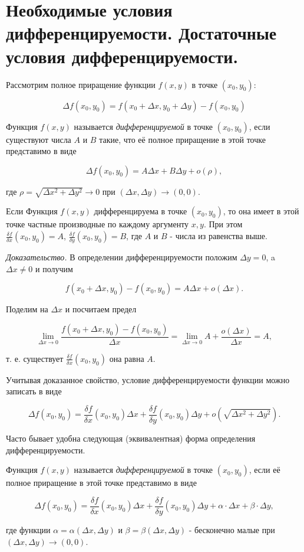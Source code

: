 \section{Необходимые условия дифференцируемости. Достаточные условия дифференцируемости.}

Рассмотрим полное приращение функции $f(x,y)$ в точке $(x_0,y_0)$:

$$\Delta{f(x_0,y_0)}=f(x_0+\Delta{x},y_0+\Delta{y})-f(x_0,y_0)$$

\begin{definition}
    Функция $f(x,y)$ называется \textit{дифференцируемой} в точке $(x_0,y_0)$, если существуют числа $A$ и $B$
    такие, что её полное приращение в этой точке представимо в виде
\end{definition}

$$\Delta{f(x_0,y_0)}=A\Delta{x}+B\Delta{y}+o(\rho),$$

где $\rho=\sqrt{\Delta{x^2}+\Delta{y^2}}\to{0}$ при $(\Delta{x},\Delta{y})\to(0,0)$.

\begin{theorem}
    Если Функция $f(x,y)$ дифференцируема в точке $(x_0,y_0)$, то она имеет в этой точке частные производные по каждому аргументу $x,y$.
    При этом $\frac{\delta{f}}{\delta{x}}(x_0,y_0)=A$, $\frac{\delta{f}}{\delta{y}}(x_0,y_0)=B$,
    где $A$ и $B$ - числа из равенства выше.
\end{theorem}

\textit{Доказательство.}
В определении дифференцируемости положим $\Delta{y}=0$, a $\Delta{x}\neq{0}$ и получим

$$f(x_0+\Delta{x},y_0)-f(x_0,y_0)=A\Delta{x}+o(\Delta{x}).$$

Поделим на $\Delta{x}$ и посчитаем предел

$$\lim_{\Delta{x}\to{0}}\frac{f(x_0+\Delta{x},y_0)-f(x_0,y_0)}{\Delta{x}}=\lim_{\Delta{x}\to{0}}A+\frac{o(\Delta{x})}{\Delta{x}}=A,$$

т. е. существует $\frac{\delta{f}}{\delta{x}}(x_0,y_0)$  она равна $A$.

Учитывая доказанное свойство, условие дифференцируемости функции можно записать в виде

$$\Delta{f(x_0,y_0)}=\frac{\delta{f}}{\delta{x}}(x_0,y_0)\Delta{x}+\frac{\delta{f}}{\delta{y}}(x_0,y_0)\Delta{y}+o(\sqrt{\Delta{x^2}+\Delta{y^2}}).$$

Часто бывает удобна следующая (эквивалентная) форма определения дифференцируемости.

\begin{definition}
    Функция $f(x,y)$ называется \textit{дифференцируемой} в точке $(x_0,y_0)$, если её полное приращение в этой точке представимо в виде
\end{definition}

$$\Delta{f(x_0,y_0)}=\frac{\delta{f}}{\delta{x}}(x_0,y_0)\Delta{x}+\frac{\delta{f}}{\delta{y}}(x_0,y_0)\Delta{y}+\alpha\cdot\Delta{x}+\beta\cdot\Delta{y},$$

где функции $\alpha=\alpha(\Delta{x},\Delta{y})$ и $\beta=\beta(\Delta{x},\Delta{y})$ - бесконечно малые при $(\Delta{x},\Delta{y})\to(0,0)$.
